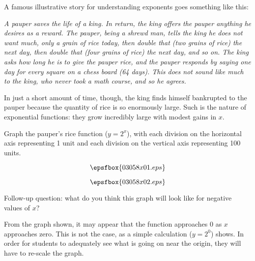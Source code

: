 

A famous illustrative story for understanding exponents goes something like this:

\vskip 10pt {\narrower \noindent \baselineskip5pt

{\it A pauper saves the life of a king.  In return, the king offers the pauper anything he desires as a reward.  The pauper, being a shrewd man, tells the king he does not want much, only a grain of rice today, then double that (two grains of rice) the next day, then double that (four grains of rice) the next day, and so on.  The king asks how long he is to give the pauper rice, and the pauper responds by saying one day for every square on a chess board (64 days).  This does not sound like much to the king, who never took a math course, and so he agrees.}

\par} \vskip 10pt

In just a short amount of time, though, the king finds himself bankrupted to the pauper because the quantity of rice is so enormously large.  Such is the nature of exponential functions: they grow incredibly large with modest gains in $x$.

\vskip 10pt

Graph the pauper's rice function ($y = 2^x$), with each division on the horizontal axis representing 1 unit and each division on the vertical axis representing 100 units.

$$\epsfbox{03058x01.eps}$$







$$\epsfbox{03058x02.eps}$$

\vskip 10pt

Follow-up question: what do you think this graph will look like for negative values of $x$?







From the graph shown, it may appear that the function approaches 0 as $x$ approaches zero.  This is not the case, as a simple calculation ($y = 2^0$) shows.  In order for students to adequately see what is going on near the origin, they will have to re-scale the graph.




